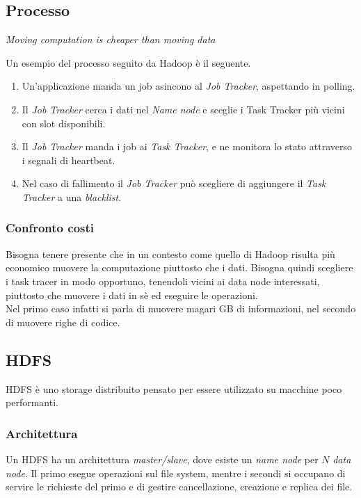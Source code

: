 \subsection{Processo}
\begin{center}
        \emph{Moving computation is cheaper than moving data}
\end{center}
Un esempio del processo seguito da Hadoop è il seguente.
\begin{enumerate}
        \item Un'applicazione manda un job asincono al \emph{Job Tracker}, aspettando in polling.
        \item Il \emph{Job Tracker} cerca i dati nel \emph{Name node} e sceglie i Task Tracker più vicini
        con slot disponibili.
        \item Il \emph{Job Tracker} manda i job ai \emph{Task Tracker}, e ne monitora 
        lo stato attraverso i segnali di heartbeat. 
        \item Nel caso di fallimento il \emph{Job Tracker}
        può scegliere di aggiungere il \emph{Task Tracker} a una \emph{blacklist}.
\end{enumerate}

\subsubsection{Confronto costi}
Bisogna tenere presente che in un contesto come quello di Hadoop risulta 
più economico muovere la computazione piuttosto che i dati.
Bisogna quindi scegliere i task tracer in modo opportuno, tenendoli vicini ai 
data node interessati, piuttosto che muovere i dati in sè ed eseguire le operazioni.\\
Nel primo caso infatti si parla di muovere magari GB di informazioni, nel secondo di muovere 
righe di codice.

\subsection{HDFS}
HDFS è uno storage distribuito pensato per essere utilizzato su macchine poco
performanti.

\subsubsection{Architettura}
Un HDFS ha un architettura \emph{master/slave}, dove esiste un \emph{name node} per $N$ \emph{data node}.
Il primo esegue operazioni sul file system, mentre i secondi si occupano di 
servire le richieste del primo e di gestire cancellazione, creazione e replica dei 
file.

